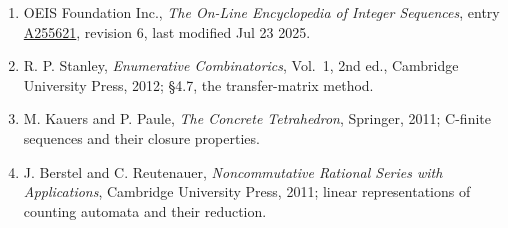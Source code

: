 \documentclass[11pt]{article}
\theoremstyle{definition}
\begin{document}
\begin{enumerate}

\item OEIS Foundation Inc., \emph{The On-Line Encyclopedia of Integer Sequences}, entry \href{https://oeis.org/A255621}{A255621}, revision 6, last modified Jul 23 2025.

\item R. P. Stanley, \emph{Enumerative Combinatorics}, Vol.~1, 2nd ed., Cambridge University Press, 2012; \S4.7, the transfer-matrix method.

\item M. Kauers and P. Paule, \emph{The Concrete Tetrahedron}, Springer, 2011; C-finite sequences and their closure properties.

\item J. Berstel and C. Reutenauer, \emph{Noncommutative Rational Series with Applications}, Cambridge University Press, 2011; linear representations of counting automata and their reduction.

\end{enumerate}
\end{document}
